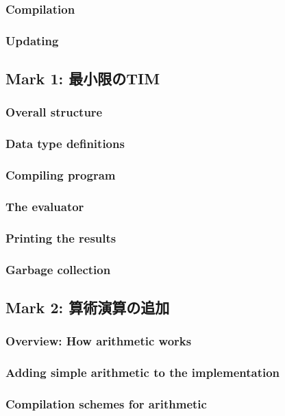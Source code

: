 \documentclass{jarticle}
\begin{document}
\subsubsection{Compilation}
\subsubsection{Updating}

\subsection{Mark 1: 最小限のTIM}
\subsubsection{Overall structure}
\subsubsection{Data type definitions}
\subsubsection{Compiling program}
\subsubsection{The evaluator}
\subsubsection{Printing the results}
\subsubsection{Garbage collection \dag}

\subsection{Mark 2: 算術演算の追加}
\subsubsection{Overview: How arithmetic works}
\subsubsection{Adding simple arithmetic to the implementation}
\subsubsection{Compilation schemes for arithmetic}
\end{document}
